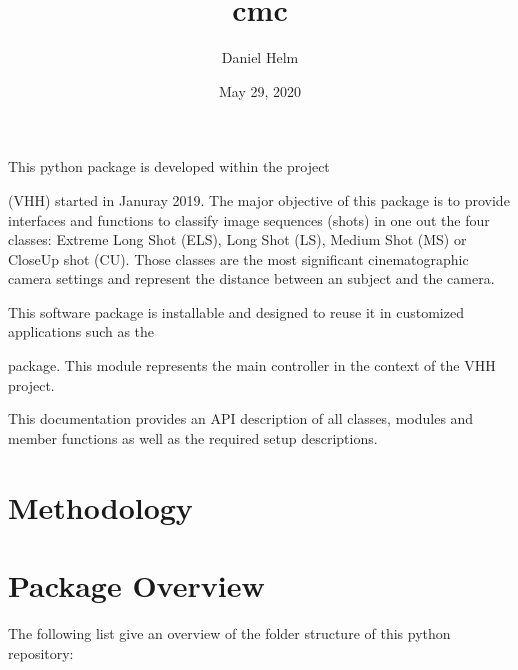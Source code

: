 \documentclass[letterpaper,10pt,english]{sphinxmanual}
\title{cmc}
\date{May 29, 2020}
\author{Daniel Helm}
\begin{document}
\pagestyle{empty}
\sphinxmaketitle
\pagestyle{plain}
\sphinxtableofcontents
\pagestyle{normal}
\label{\detokenize{index::doc}}


This python package is developed within the project  %
\begin{footnote}[1]\sphinxAtStartFootnote
{}
%
\end{footnote} (VHH) started in Januray 2019.
The major objective of this package is to provide interfaces and functions to classify image sequences
(shots) in one out the four classes: Extreme Long Shot (ELS), Long Shot (LS), Medium Shot (MS) or Close\sphinxhyphen{}Up shot (CU).
Those classes are the most significant cinematographic camera settings and represent the distance between an subject
and the camera.

This software package is installable and designed to reuse it in customized applications such as the  %
\begin{footnote}[2]\sphinxAtStartFootnote
{}
%
\end{footnote} package. This
module represents the main controller in the context of the VHH project.

This documentation provides an API description of all classes, modules and member functions as well as
the required setup descriptions.


\chapter{Methodology}
\label{\detokenize{index:methodology}}

\chapter{Package Overview}
\label{\detokenize{index:package-overview}}
The following list give an overview of the folder structure of this python repository:
\end{document}
